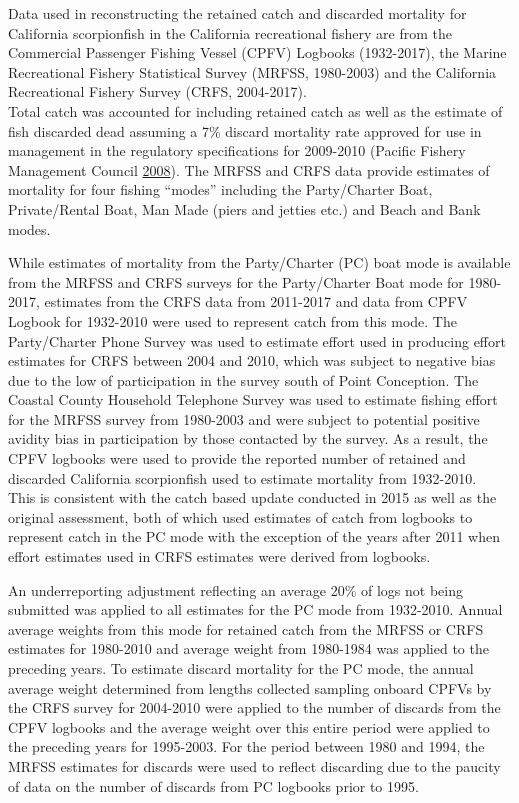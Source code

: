 \documentclass[12pt,]{article}
\begin{document}
Data used in reconstructing the retained catch and discarded mortality
for California scorpionfish in the California recreational fishery are
from the Commercial Passenger Fishing Vessel (CPFV) Logbooks
(1932-2017), the Marine Recreational Fishery Statistical Survey (MRFSS,
1980-2003) and the California Recreational Fishery Survey (CRFS,
2004-2017).\\
Total catch was accounted for including retained catch as well as the
estimate of fish discarded dead assuming a 7\% discard mortality rate
approved for use in management in the regulatory specifications for
2009-2010 (Pacific Fishery Management Council
\protect\hyperlink{ref-PFMC2008}{2008}). The MRFSS and CRFS data provide
estimates of mortality for four fishing ``modes'' including the
Party/Charter Boat, Private/Rental Boat, Man Made (piers and jetties
etc.) and Beach and Bank modes.

While estimates of mortality from the Party/Charter (PC) boat mode is
available from the MRFSS and CRFS surveys for the Party/Charter Boat
mode for 1980-2017, estimates from the CRFS data from 2011-2017 and data
from CPFV Logbook for 1932-2010 were used to represent catch from this
mode. The Party/Charter Phone Survey was used to estimate effort used in
producing effort estimates for CRFS between 2004 and 2010, which was
subject to negative bias due to the low of participation in the survey
south of Point Conception. The Coastal County Household Telephone Survey
was used to estimate fishing effort for the MRFSS survey from 1980-2003
and were subject to potential positive avidity bias in participation by
those contacted by the survey. As a result, the CPFV logbooks were used
to provide the reported number of retained and discarded California
scorpionfish used to estimate mortality from 1932-2010.\\
This is consistent with the catch based update conducted in 2015 as well
as the original assessment, both of which used estimates of catch from
logbooks to represent catch in the PC mode with the exception of the
years after 2011 when effort estimates used in CRFS estimates were
derived from logbooks.

An underreporting adjustment reflecting an average 20\% of logs not
being submitted was applied to all estimates for the PC mode from
1932-2010. Annual average weights from this mode for retained catch from
the MRFSS or CRFS estimates for 1980-2010 and average weight from
1980-1984 was applied to the preceding years. To estimate discard
mortality for the PC mode, the annual average weight determined from
lengths collected sampling onboard CPFVs by the CRFS survey for
2004-2010 were applied to the number of discards from the CPFV logbooks
and the average weight over this entire period were applied to the
preceding years for 1995-2003. For the period between 1980 and 1994, the
MRFSS estimates for discards were used to reflect discarding due to the
paucity of data on the number of discards from PC logbooks prior to
1995.
\end{document}
